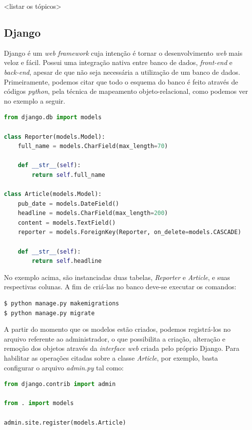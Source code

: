 \documentclass[12pt,a4paper,oneside]{book}
\begin{document}
<listar os tópicos>

\subsection{Django}

Django é um \textit{web framework} cuja intenção é tornar o desenvolvimento \textit{web} mais veloz e fácil. Possui uma integração nativa entre banco de dados, \textit{front-end} e \textit{back-end}, apesar de que não seja necessária a utilização de um banco de dados. Primeiramente, podemos citar que todo o esquema do banco é feito através de códigos \textit{python}, pela técnica de mapeamento objeto-relacional, como podemos ver no exemplo a seguir\cite{django}.

\begin{lstlisting}[language=Python]
from django.db import models

class Reporter(models.Model):
    full_name = models.CharField(max_length=70)

    def __str__(self):
        return self.full_name

class Article(models.Model):
    pub_date = models.DateField()
    headline = models.CharField(max_length=200)
    content = models.TextField()
    reporter = models.ForeignKey(Reporter, on_delete=models.CASCADE)

    def __str__(self):
        return self.headline
\end{lstlisting}

No exemplo acima, são instanciadas duas tabelas, \textit{Reporter} e \textit{Article}, e suas respectivas colunas. A fim de criá-las no banco deve-se executar os comandos:

\begin{lstlisting}[language=bash] 
$ python manage.py makemigrations
$ python manage.py migrate
\end{lstlisting}

A partir do momento que os modelos estão criados, podemos registrá-los no arquivo referente ao administrador, o que possibilita a criação, alteração e remoção dos objetos através da \textit{interface web} criada pelo próprio Django. Para habilitar as operações citadas sobre a classe \textit{Article}, por exemplo, basta configurar o arquivo \textit{admin.py} tal como:

\begin{lstlisting}[language=Python]
from django.contrib import admin

from . import models

admin.site.register(models.Article)
\end{lstlisting}
\end{document}
